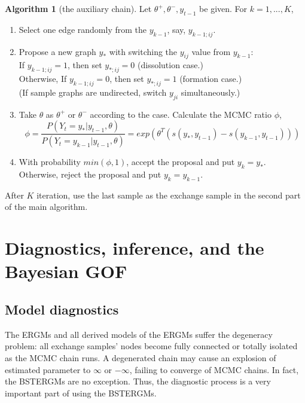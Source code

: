 \documentclass[a4paper, 11pt]{report}
\theoremstyle{definition}
\newtheorem{algo}{Algorithm}[section]
\begin{document}
\begin{algo}[the auxiliary chain]
Let $\theta^+,\theta^-,y_{t-1}$ be given. For $k=1,...,K$,
\begin{enumerate}
    \item Select one edge randomly from the $y_{k-1}$, say, $y_{k-1;ij}$.
    \item Propose a new graph $y_*$ with switching the $y_{ij}$ value from $y_{k-1}$: 
    \\ If $y_{k-1;ij}=1$, then set $y_{*;ij}=0$ (dissolution case.) 
    \\ Otherwise, If $y_{k-1;ij}=0$, then set $y_{*;ij}=1$ (formation case.)
    \\ (If sample graphs are undirected, switch $y_{ji}$ simultaneously.)
    \item Take $\theta$ as $\theta^+$ or $\theta^-$ according to the case. Calculate the MCMC ratio $\phi$,
    \[\phi = \frac{P(Y_t=y_*|y_{t-1},\theta)}{P(Y_t=y_{k-1}|y_{t-1},\theta)}= exp(\theta^T (s(y_{*},y_{t-1}) - s(y_{k-1},y_{t-1})))\]
    \item With probability $min(\phi,1)$, accept the proposal and put $y_k=y_*$.\\
        Otherwise, reject the proposal and put $y_k=y_{k-1}$.
\end{enumerate}
\end{algo}

After $K$ iteration, use the last sample as the exchange sample in the second part of the main algorithm.



\chapter{Diagnostics, inference, and the Bayesian GOF} \label{Chapter5}

\section{Model diagnostics}
The ERGMs and all derived models of the ERGMs suffer the degeneracy problem: 
all exchange samples' nodes become fully connected or totally isolated as the MCMC chain runs. 
A degenerated chain may cause an explosion of estimated parameter to $\infty$ or $-\infty$,
failing to converge of MCMC chains. In fact, the BSTERGMs are no exception. 
Thus, the diagnostic process is a very important part of using the BSTERGMs.
\end{document}
